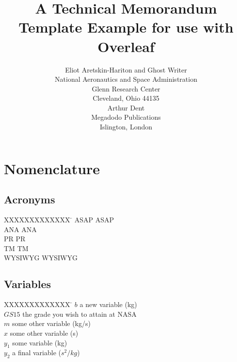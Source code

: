 \documentclass[]{NASA}
\title{A Technical Memorandum Template Example for use with Overleaf}
\author{
  Eliot Aretskin-Hariton and Ghost Writer\\
  National Aeronautics and Space Administration\\
  Glenn Research Center\\
  Cleveland, Ohio 44135\\
  \vspace{5mm}
  Arthur Dent\\
  Megadodo Publications\\
  Islington, London\\
  }
\begin{document}
\maketitle
\newpage

\section*{Nomenclature}
\subsection*{Acronyms}
\begin{tabbing}
  XXXXXXXXXXXXX \= \kill%
  \acs{ASAP} \> \acl{ASAP} \\
  \acs{ANA} \> \acl{ANA} \\
  \acs{PR} \> \acl{PR} \\
  \acs{TM} \> \acl{TM} \\
  \acs{WYSIWYG} \> \acl{WYSIWYG} \\

\end{tabbing}

\subsection*{Variables}
\begin{tabbing}
  XXXXXXXXXXXXX \= \kill%
  $b$ \> a new variable (kg) \\
  $GS15$ \> the grade you wish to attain at NASA \\
  $m$   \> some other variable (kg/s) \\
  $x$ \> some other variable (s) \\
  $y_1$ \> some variable (kg) \\ 
  $y_2$ \> a final variable ($s^2/kg$) \\
\end{tabbing}
\acresetall         %
\end{document}
